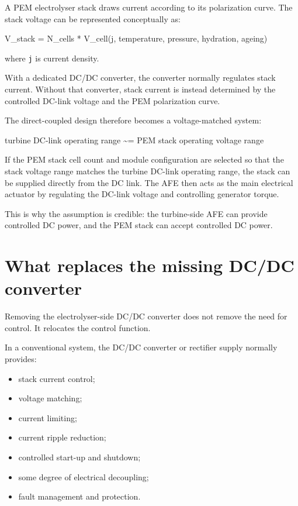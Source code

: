 \documentclass[
  letterpaper,
  DIV=11,
  numbers=noendperiod]{scrartcl}
\newenvironment{Shaded}{\begin{snugshade}}{\end{snugshade}}
\newcommand{\NormalTok}[1]{\textcolor[rgb]{0.00,0.23,0.31}{#1}}
\providecommand{\tightlist}{%
  \setlength{\itemsep}{0pt}\setlength{\parskip}{0pt}}
\begin{document}
A PEM electrolyser stack draws current according to its polarization
curve. The stack voltage can be represented conceptually as:

\begin{Shaded}
\begin{Highlighting}[]
\NormalTok{V\_stack = N\_cells * V\_cell(j, temperature, pressure, hydration, ageing)}
\end{Highlighting}
\end{Shaded}

where \texttt{j} is current density.

With a dedicated DC/DC converter, the converter normally regulates stack
current. Without that converter, stack current is instead determined by
the controlled DC-link voltage and the PEM polarization curve.

The direct-coupled design therefore becomes a voltage-matched system:

\begin{Shaded}
\begin{Highlighting}[]
\NormalTok{turbine DC{-}link operating range \textasciitilde{}= PEM stack operating voltage range}
\end{Highlighting}
\end{Shaded}

If the PEM stack cell count and module configuration are selected so
that the stack voltage range matches the turbine DC-link operating
range, the stack can be supplied directly from the DC link. The AFE then
acts as the main electrical actuator by regulating the DC-link voltage
and controlling generator torque.

This is why the assumption is credible: the turbine-side AFE can provide
controlled DC power, and the PEM stack can accept controlled DC power.

\section{What replaces the missing DC/DC
converter}\label{what-replaces-the-missing-dcdc-converter}

Removing the electrolyser-side DC/DC converter does not remove the need
for control. It relocates the control function.

In a conventional system, the DC/DC converter or rectifier supply
normally provides:

\begin{itemize}
\tightlist
\item
  stack current control;
\item
  voltage matching;
\item
  current limiting;
\item
  current ripple reduction;
\item
  controlled start-up and shutdown;
\item
  some degree of electrical decoupling;
\item
  fault management and protection.
\end{itemize}
\end{document}
